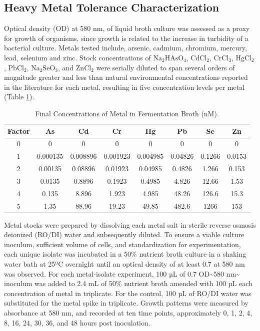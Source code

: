 \documentclass[ms, hidelinks]{uncgdissertationexp}
\theoremstyle{plain}
\theoremstyle{definition}
\theoremstyle{remark}
\begin{document}
\hypertarget{heavy-metal-tolerance-characterization}{%
\subsection{Heavy Metal Tolerance Characterization}\label{heavy-metal-tolerance-characterization}}

Optical density (OD) at 580 nm, of liquid broth culture was assessed as a proxy for growth of organisms, since growth is related to the increase in turbidity of a bacterial culture. Metals tested include, arsenic, cadmium, chromium, mercury, lead, selenium and zinc. Stock concentrations of \(\mathrm{Na_2HAsO_4}\), \(\mathrm{CdCl_2}\), \(\mathrm{CrCl_3}\), \(\mathrm{HgCl_2}\), \(\mathrm{PbCl_2}\), \(\mathrm{Na_2SeO_3}\), and \(\mathrm{ZnCl_2}\) were serially diluted to span several orders of magnitude greater and less than natural environmental concentrations reported in the literature for each metal, resulting in five concentration levels per metal (Table \ref{tab:metals}).
\begin{table}[htbp]
\caption[Final Concentrations of Metal in Broth (nM).]{Final Concentrations of Metal in Fermentation Broth (nM).}\label{tab:metals}
\centering
\begin{tabular}{cccccccc}
\toprule
Factor & As & Cd & Cr & Hg & Pb & Se & Zn\\
\midrule
0 & 0 & 0 & 0 & 0 & 0 & 0 & 0\\ 
1 & 0.000135 & 0.008896 & 0.001923 & 0.004985 & 0.04826 & 0.1266 & 0.0153\\
2 & 0.00135 & 0.08896 & 0.01923 & 0.04985 & 0.4826 & 1.266 & 0.153\\
3 & 0.0135 & 0.8896 & 0.1923 & 0.4985 & 4.826 & 12.66 & 1.53\\
4 & 0.135 & 8.896 & 1.923 & 4.985 & 48.26 & 126.6 & 15.3\\
5 & 1.35 & 88.96 & 19.23 & 49.85 & 482.6 & 1266 & 153\\
\bottomrule
\end{tabular}
\end{table}

Metal stocks were prepared by dissolving each metal salt in sterile reverse osmosis deionized (RO/DI) water and subsequently diluted. To ensure a viable culture inoculum, sufficient volume of cells, and standardization for experimentation, each unique isolate was incubated in a 50\% nutrient broth culture in a shaking water bath at 25ºC overnight until an optical density of at least 0.7 at 580 nm was observed. For each metal-isolate experiment, 100 µL of 0.7 OD\textasciitilde580 nm\textasciitilde{} inoculum was added to 2.4 mL of 50\% nutrient broth amended with 100 µL each concentration of metal in triplicate. For the control, 100 µL of RO/DI water was substituted for the metal spike in triplicate. Growth patterns were measured by absorbance at 580 nm, and recorded at ten time points, approximately 0, 1, 2, 4, 8, 16, 24, 30, 36, and 48 hours post inoculation.
\end{document}
